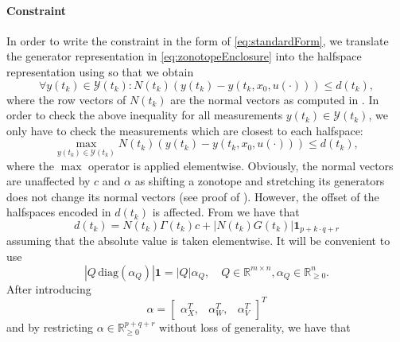 \documentclass[EPiC]{easychair}
\renewcommand{\^}[1]{^{(#1)}}
\begin{document}
\paragraph{Constraint}
In order to write the constraint in the form of \eqref{eq:standardForm}, we translate the generator representation in \eqref{eq:zonotopeEnclosure} into the halfspace representation using \cite[Thm.~7]{Althoff2010d} so that we obtain
\begin{equation*}
 \forall y(t_k) \in \mathcal{Y}(t_k): N(t_k) (y(t_k) - y(t_k,x_0,u(\cdot))) \leq d(t_k),
\end{equation*}
where the row vectors of $N(t_k)$ are the normal vectors as computed in \cite[Thm.~7]{Althoff2010d}. In order to check the above inequality for all measurements $y(t_k) \in \mathcal{Y}(t_k)$, we only have to check the measurements which are closest to each halfspace:
\begin{equation} \label{eq:containmentCheck}
 \max_{y(t_k) \in \mathcal{Y}(t_k)} N(t_k) (y(t_k) - y(t_k,x_0,u(\cdot))) \leq d(t_k),
\end{equation}
where the $\max$ operator is applied elementwise.
Obviously, the normal vectors are unaffected by $c$ and $\alpha$ as shifting a zonotope and stretching its generators does not change its normal vectors (see proof of \cite[Thm.~1]{Liu2023}). However, the offset of the halfspaces encoded in $d(t_k)$ is affected. From \cite[Thm.~7]{Althoff2010d} we have that
\begin{equation}\label{eq:d}
    d(t_k) = N(t_k) \Gamma(t_k) c + |N(t_k) G(t_k)|\mathbf{1}_{p+k\cdot q+r}
\end{equation}
assuming that the absolute value is taken elementwise. It will be convenient to use
\begin{equation} \label{eq:factoringOutAlpha}
 |Q \, \mathrm{diag}(\alpha_Q)| \mathbf{1} = |Q| \alpha_Q, \quad Q \in \mathbb{R}^{m \times n}, \alpha_Q \in \mathbb{R}_{\geq 0}^{n}.
\end{equation}
After introducing
\begin{equation*}
 \alpha = \begin{bmatrix} \alpha_X^T, & \alpha_W^T, & \alpha_V^T \end{bmatrix}^T
\end{equation*}
and by restricting $\alpha \in \mathbb{R}_{\geq 0}^{p+q+r}$ without loss of generality, we have that
\end{document}
